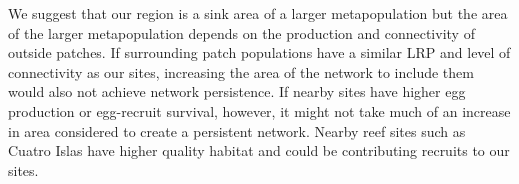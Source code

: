 \documentclass[12pt, oneside]{article}   	%
\begin{document}
We suggest that our region is a sink area of a larger metapopulation but the area of the larger metapopulation depends on the production and connectivity of outside patches. If surrounding patch populations have a similar LRP and level of connectivity as our sites, increasing the area of the network to include them would also not achieve network persistence. If nearby sites have higher egg production or egg-recruit survival, however, it might not take much of an increase in area considered to create a persistent network. Nearby reef sites such as Cuatro Islas have higher quality habitat and could be contributing recruits to our sites. %

\end{document}
